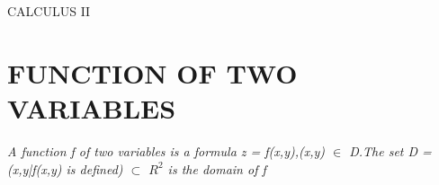 \documentclass[12pt]{article}
\begin{document}
\begin{center}
CALCULUS II
\end{center}
\section{FUNCTION OF TWO VARIABLES}
\begin{mybox}
\textit{A function f of two variables is a formula z = f(x,y),(x,y) $\in$ D.The set D = {(x,y|f(x,y) is defined)} $\subset$ $R^2$ is the domain of f}
\end{mybox}
\end{document}
